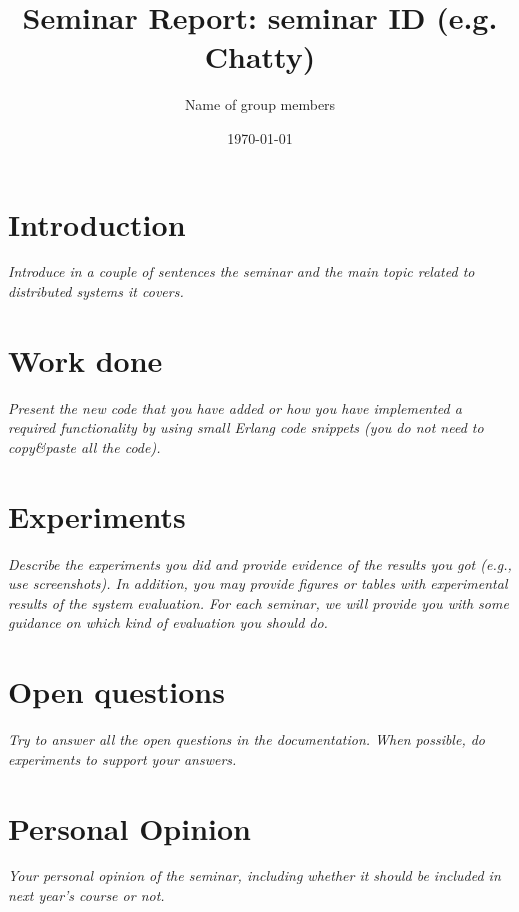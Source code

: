 \documentclass[a4paper, 11pt]{article}
\title{Seminar Report: seminar ID (e.g. Chatty)}
\author{Name of group members}
\date{\today{}}
\begin{document}
\maketitle

\section{Introduction}

\textit{Introduce in a couple of sentences the seminar and the main topic related to distributed systems it covers.}


\section{Work done}

\textit{Present the new code that you have added or how you have implemented a required functionality by using small Erlang code snippets (you do not need to copy\&paste all the code).}

\section{Experiments}

\textit{Describe the experiments you did and provide evidence of the results you got (e.g., use screenshots). In addition, you may provide figures or tables with experimental results of the system evaluation. For each seminar, we will provide you with some guidance on which kind of evaluation you should do.}

\section{Open questions}

\textit{Try to answer all the open questions in the documentation. When possible, do experiments to support your answers.}

\section{Personal Opinion}

\textit{Your personal opinion of the seminar, including whether it should be included in next year's course or not.}
\end{document}

